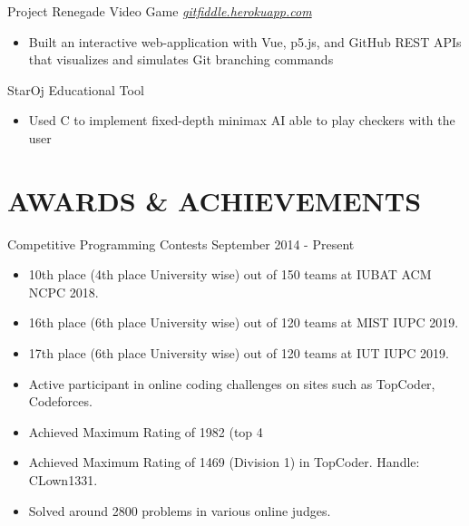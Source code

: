 \documentclass{resumestyle}
\begin{document}
    \projectsubsection%
        {Project Renegade}%
        {Video Game \hfill
        \textit{\href{http://gitfiddle.herokuapp.com/}{\textcolor{link}{gitfiddle.herokuapp.com}}}}%
    \begin{itemize}[labelsep=4pt,leftmargin=*,topsep=5pt,partopsep=0pt,itemsep=1pt]%
        \item Built an interactive web-application with Vue, p5.js, and GitHub REST APIs that visualizes and simulates Git branching commands
    \end{itemize}%

    \projectsubsection%
        {StarOj}%
        {Educational Tool}%
    \begin{itemize}[labelsep=4pt,leftmargin=*,topsep=5pt,partopsep=0pt,itemsep=1pt]%
        \item Used C\scalebox{0.8}{++} to implement fixed-depth minimax AI able to play checkers with the user
    \end{itemize}%


\vspace{-4pt}

\section{AWARDS \& ACHIEVEMENTS}%

    \worksubsection%
        {Competitive Programming Contests}%
        {September 2014 - Present}%
        {}%
    
    \begin{itemize}[labelsep=4pt,leftmargin=*,topsep=5pt,partopsep=0pt,itemsep=1pt]%
        \item 10th place (4th place University wise) out of 150 teams at IUBAT ACM NCPC 2018.
        \item 16th place (6th place University wise) out of 120 teams at MIST IUPC 2019.
        \item 17th place (6th place University wise) out of 120 teams at IUT IUPC 2019.
        \item Active participant in online coding challenges on sites such as TopCoder, Codeforces.
        \item Achieved Maximum Rating of 1982 (top 4%
        \item Achieved Maximum Rating of 1469 (Division 1) in TopCoder. Handle: CLown1331.
        \item Solved around 2800 problems in various online judges. 
    \end{itemize}%
\end{document}
